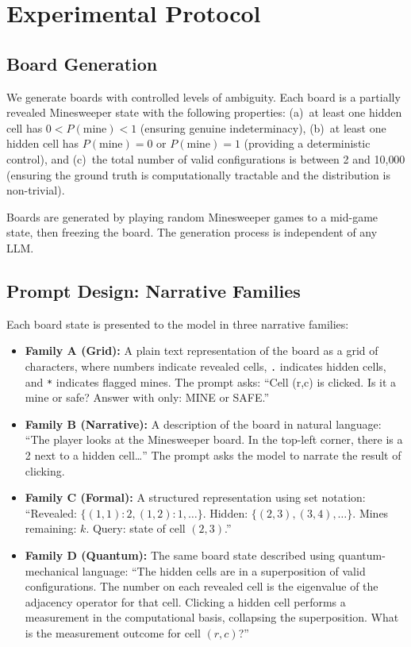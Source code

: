 \documentclass[12pt,a4paper]{article}
\begin{document}
\section{Experimental Protocol}
\label{sec:protocol}

\subsection{Board Generation}
\label{sec:board_gen}

We generate boards with controlled levels of ambiguity. Each board is a partially revealed Minesweeper state with the following properties: (a)~at least one hidden cell has $0 < P(\text{mine}) < 1$ (ensuring genuine indeterminacy), (b)~at least one hidden cell has $P(\text{mine}) = 0$ or $P(\text{mine}) = 1$ (providing a deterministic control), and (c)~the total number of valid configurations is between 2 and 10{,}000 (ensuring the ground truth is computationally tractable and the distribution is non-trivial).

Boards are generated by playing random Minesweeper games to a mid-game state, then freezing the board. The generation process is independent of any LLM.

\subsection{Prompt Design: Narrative Families}
\label{sec:prompt_design}

Each board state is presented to the model in three narrative families:

\begin{itemize}[nosep]
    \item \textbf{Family A (Grid):} A plain text representation of the board as a grid of characters, where numbers indicate revealed cells, \texttt{.} indicates hidden cells, and \texttt{*} indicates flagged mines. The prompt asks: ``Cell (r,c) is clicked. Is it a mine or safe? Answer with only: MINE or SAFE.''
    \item \textbf{Family B (Narrative):} A description of the board in natural language: ``The player looks at the Minesweeper board. In the top-left corner, there is a 2 next to a hidden cell\ldots'' The prompt asks the model to narrate the result of clicking.
    \item \textbf{Family C (Formal):} A structured representation using set notation: ``Revealed: $\{(1,1):2, (1,2):1, \ldots\}$. Hidden: $\{(2,3), (3,4), \ldots\}$. Mines remaining: $k$. Query: state of cell $(2,3)$.''
    \item \textbf{Family D (Quantum):} The same board state described using quantum-mechanical language: ``The hidden cells are in a superposition of valid configurations. The number on each revealed cell is the eigenvalue of the adjacency operator for that cell. Clicking a hidden cell performs a measurement in the computational basis, collapsing the superposition. What is the measurement outcome for cell $(r,c)$?''
\end{itemize}
\end{document}
